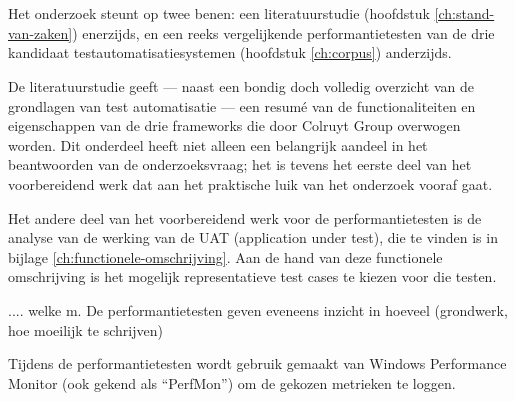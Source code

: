 
\chapter{}
\label{ch:methodologie}


Het onderzoek steunt op twee benen: een literatuurstudie (hoofdstuk \ref{ch:stand-van-zaken}) enerzijds, en een reeks vergelijkende performantietesten van de drie kandidaat testautomatisatiesystemen (hoofdstuk \ref{ch:corpus}) anderzijds.

De literatuurstudie geeft — naast een bondig doch volledig overzicht van de grondlagen van test automatisatie — een resumé van de functionaliteiten en eigenschappen van de drie frameworks die door Colruyt Group overwogen worden. Dit onderdeel heeft niet alleen een belangrijk aandeel in het beantwoorden van de onderzoeksvraag; het is tevens het eerste deel van het voorbereidend werk dat aan het praktische luik van het onderzoek vooraf gaat.


Het andere deel van het voorbereidend werk voor de performantietesten is de analyse van de werking van de UAT (application under test), die te vinden is in bijlage \ref{ch:functionele-omschrijving}. Aan de hand van deze functionele omschrijving is het mogelijk representatieve test cases te kiezen voor die testen.


.... welke m. De performantietesten geven eveneens inzicht in hoeveel (grondwerk, hoe moeilijk te schrijven)

Tijdens de performantietesten wordt gebruik gemaakt van Windows \textsuperscript{\textregistered} Performance Monitor (ook gekend als ``PerfMon'') om de gekozen metrieken te loggen.

